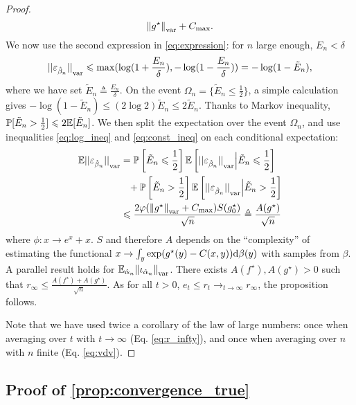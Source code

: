 \begin{proof}
\begin{equation}
    {\Vert g^\star \Vert}_{\text{\upshape var}} + C_{\max}.
\end{equation}
 We now use the second expression in \eqref{eq:expression}: for $n$ large enough, $E_n < \delta$
\begin{equation}\label{eq:log_ineq}
    {|| \varepsilon_{\hat \beta_n} ||}_{\text{\upshape var}} \leqslant \max ( \log(1 + \frac{E_n}{\delta}),
     - \log(1 - \frac{E_n}{\delta}) ) = 
    - \log(1 - \tilde E_n),
\end{equation}
where we have set $\tilde E_n \triangleq \frac{E_n}{\delta}$. On the event
$\Omega_n = \{\tilde E_n \leq \frac{1}{2}\}$, a simple calculation gives $- \log(1
- \tilde E_n) \leq (2 \log 2) \tilde E_n \leq 2 \tilde E_n$. Thanks to Markov inequality,
$\mathbb{P}[\tilde E_n > \frac{1}{2}] \leqslant 2 \mathbb{E}[\tilde E_n]$. We then split the
expectation over the event $\Omega_n$, and use inequalities \eqref{eq:log_ineq}
and \eqref{eq:const_ineq} on each conditional expectation:
\begin{align}\label{eq:vdv}
    \mathbb{E} {|| \varepsilon_{\hat \beta_n} ||}_{\text{\upshape var}}  &= \mathbb{P}\left[\tilde E_n \leqslant \frac{1}{2}\right] 
    \mathbb{E} \left[ {|| \varepsilon_{\hat \beta_n} ||}_{\text{\upshape var}}
    \Big| \tilde E_n \leqslant \frac{1}{2}\right] 
    \\
    &\phantom{=}
    + \mathbb{P}\left[\tilde E_n > \frac{1}{2}\right]      \mathbb{E} \left[ {|| \varepsilon_{\hat \beta_n} ||}_{\text{\upshape var}}
    \Big| \tilde E_n > \frac{1}{2}\right] \\
    &\leqslant \frac{2 \varphi({\Vert g^\star \Vert}_{\text{\upshape var}} + C_{\max}) 
    S(g^\star_0)}{\sqrt{n}} \triangleq \frac{A(g^\star)}{\sqrt{n}}
\end{align}
where $\phi: x \to e^x +x$. $S$ and therefore $A$ depends on the ``complexity'' of estimating
the functional $x \to \int_y \exp(g^\star(y) - C(x,y)) \textrm{d} \beta(y)$ with samples from $\beta$.
A parallel
result holds for $\mathbb{E}_{\hat \alpha_n} {\Vert \iota_{\hat \alpha_n}
\Vert}_{\text{\upshape var}}$. There exists $A(f^\star), A(g^\star) > 0$ such that $r_\infty \leq
\frac{A(f^\star) + A(g^\star)}{\sqrt{n}}$. As for all $t >0$, $e_t \leq r_t \to_{t \to \infty}
r_\infty$, the proposition follows.

Note that we have used twice a corollary of the law of large numbers: once when
averaging over $t$ with $t \to \infty$ (Eq. \eqref{eq:r_infty}), and once when
averaging over $n$ with $n$ finite (Eq. \eqref{eq:vdv}).
\end{proof}

\subsection{Proof of \autoref{prop:convergence_true}}\label{sec:proof_prop_convergence}

